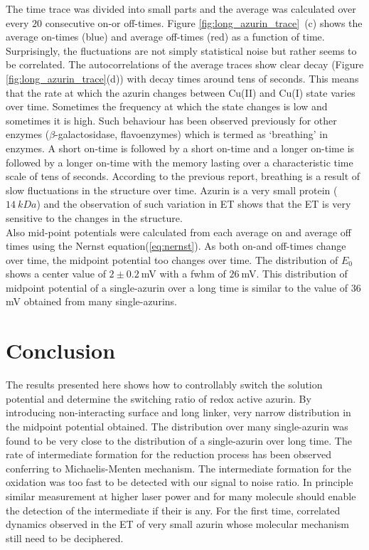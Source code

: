 The time trace was divided into small parts and the average was calculated over every $20$ consecutive on-or off-times. Figure \ref{fig:long_azurin_trace}~(c) shows the average on-times (blue) and average off-times (red) as a function of time. Surprisingly, the fluctuations are not simply statistical noise but rather seems to be correlated. The autocorrelations of the average traces show clear decay (Figure \ref{fig:long_azurin_trace}(d)) with decay times around tens of seconds. This means that the rate at which the azurin changes between Cu(II) and Cu(I) state varies over time. Sometimes the frequency at which the state changes is low and sometimes it is high. Such behaviour has been observed previously for other enzymes ($\beta$-galactosidase, flavoenzymes)\cite{lu1998single-molecule,kou2005single-molecule,english2006ever-fluctuating} which is termed as `breathing' in enzymes. A short on-time is followed by a short on-time and a longer on-time is followed by a longer on-time with the memory lasting over a characteristic time scale of tens of seconds. According to the previous report, breathing is a result of slow fluctuations in the structure over time. Azurin is a very small protein ($14~kDa$) and the observation of such variation in ET shows that the ET is very sensitive to the changes in the structure.\\

Also mid-point potentials were calculated from each average on and average off times using the Nernst equation(\ref{eq:nernst}). As both on-and off-times change over time, the midpoint potential too changes over time. The distribution of $E_0$ shows a center value of $2\pm0.2~$mV with a fwhm of $26~$mV. This distribution of midpoint potential of a single-azurin over a long time is similar to the value of $36~$mV obtained from many single-azurins.
\section{Conclusion}
The results presented here shows how to controllably switch the solution potential and determine the switching ratio of redox active azurin. By introducing non-interacting surface and long linker, very narrow distribution in the midpoint potential obtained. The distribution over many single-azurin was found to be very close to the distribution of a single-azurin over long time. The rate of intermediate formation for the reduction process has been observed conferring to Michaelis-Menten mechanism. The intermediate formation for the oxidation was too fast to be detected with our signal to noise ratio. In principle similar measurement at higher laser power and for many molecule should enable the detection of the intermediate if their is any. For the first time, correlated dynamics observed in the ET of very small azurin whose molecular mechanism still need to be deciphered.

